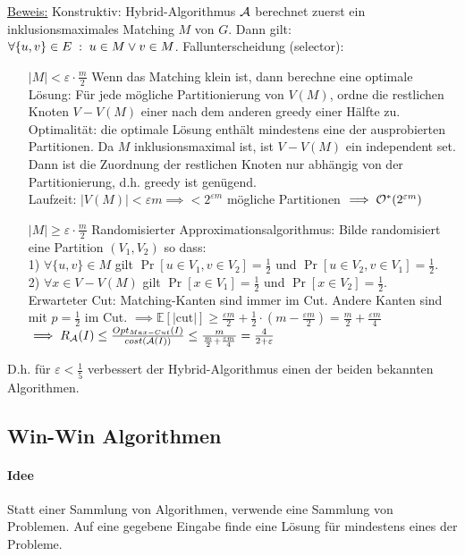 \underline{Beweis:}
Konstruktiv: Hybrid-Algorithmus $\mathcal{A}$ berechnet zuerst ein inklusionsmaximales Matching $M$ von $G$.
Dann gilt: $\forall \{u,v\} \in E \; : \; u \in M \vee v \in M$.
Fallunterscheidung (selector):
\begin{itemize}
    \item[$|M| < \varepsilon \cdot \frac{m}{2}$]
    Wenn das Matching klein ist, dann berechne eine optimale Lösung:
    Für jede mögliche Partitionierung von $V(M)$, ordne die restlichen Knoten $V-V(M)$ einer nach dem anderen
    greedy einer Hälfte zu.
    \\
    Optimalität: die optimale Lösung enthält mindestens eine der ausprobierten Partitionen.
    Da $M$ inklusionsmaximal ist, ist $V-V(M)$ ein independent set.
    Dann ist die Zuordnung der restlichen Knoten nur abhängig von der Partitionierung, d.h. greedy ist genügend.
    \\
    Laufzeit: $|V(M)| < \varepsilon m \implies < 2^{\varepsilon m}$ mögliche Partitionen
    $\implies \mathcal{O}^*(2^{\varepsilon m})$
    \item[$|M| \geq  \varepsilon \cdot \frac{m}{2}$]
    Randomisierter Approximationsalgorithmus:
    Bilde randomisiert eine Partition $(V_1, V_2)$ so dass: \\
    1) $\forall \{u,v\} \in M$ gilt $\Pr[u \in V_1, v \in V_2] = \frac{1}{2}$ und $\Pr[u \in V_2, v \in V_1] = \frac{1}{2}$. \\
    2) $\forall x \in V-V(M)$ gilt $\Pr[x \in V_1] = \frac{1}{2}$ und $\Pr[x \in V_2] = \frac{1}{2}$.
    \\
    Erwarteter Cut: Matching-Kanten sind immer im Cut. Andere Kanten sind mit $p=\frac{1}{2}$ im Cut.
    $ \implies \mathbb{E}[|\text{cut}|] \geq \frac{\varepsilon m}{2} + \frac{1}{2} \cdot (m - \frac{\varepsilon m}{2})
    = \frac{m}{2} + \frac{\varepsilon m}{4} $ \\
    $ \implies R_{\mathcal{A}}(I) \leq \frac{Opt_{Max-Cut}(I)}{cost(\mathcal{A}(I))}
    \leq \frac{m}{ \frac{m}{2} + \frac{\varepsilon m}{4} }
    = \frac{4}{2 + \varepsilon} $
\end{itemize}
D.h. für $\varepsilon < \frac{1}{5}$ verbessert der Hybrid-Algorithmus einen der beiden bekannten Algorithmen.


\subsection{Win-Win Algorithmen}

\paragraph{Idee}
Statt einer Sammlung von Algorithmen, verwende eine Sammlung von Problemen.
Auf eine gegebene Eingabe finde eine Lösung für mindestens eines der Probleme.

